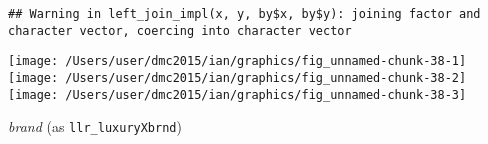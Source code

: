 \documentclass[10pt]{report}
\newenvironment{Shaded}{}{}
\newcommand{\KeywordTok}[1]{\textcolor[rgb]{0.00,0.44,0.13}{\textbf{{#1}}}}
\newcommand{\DataTypeTok}[1]{\textcolor[rgb]{0.56,0.13,0.00}{{#1}}}
\newcommand{\StringTok}[1]{\textcolor[rgb]{0.25,0.44,0.63}{{#1}}}
\newcommand{\NormalTok}[1]{{#1}}
\begin{document}
\begin{Shaded}
\end{Shaded}

\begin{verbatim}
## Warning in left_join_impl(x, y, by$x, by$y): joining factor and character vector, coercing into character vector
\end{verbatim}

\begin{Shaded}
\end{Shaded}

\begin{center}\texttt{[image: /Users/user/dmc2015/ian/graphics/fig\_unnamed-chunk-38-1]} \texttt{[image: /Users/user/dmc2015/ian/graphics/fig\_unnamed-chunk-38-2]} \texttt{[image: /Users/user/dmc2015/ian/graphics/fig\_unnamed-chunk-38-3]} \end{center}

\emph{brand} (as \texttt{llr\_luxuryXbrnd})
\end{document}
